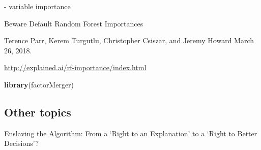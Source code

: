 \documentclass[12pt,]{krantz}
\newenvironment{Shaded}{\begin{snugshade}}{\end{snugshade}}
\newcommand{\KeywordTok}[1]{\textcolor[rgb]{0.13,0.29,0.53}{\textbf{#1}}}
\newcommand{\NormalTok}[1]{#1}
\begin{document}
\citep{demsar2018}

\citep{RJ2017016}
\citep{MAGIX}

\citep{R-factorMerger}

\citep{Strobl2007}
\citep{Strobl2008}
- variable importance

\citep{2018arXiv180101489F}

Beware Default Random Forest Importances

Terence Parr, Kerem Turgutlu, Christopher Csiszar, and Jeremy Howard
March 26, 2018.

\url{http://explained.ai/rf-importance/index.html}

\begin{Shaded}
\begin{Highlighting}[]
\KeywordTok{library}\NormalTok{(factorMerger)}
\end{Highlighting}
\end{Shaded}

\hypertarget{other-topics}{%
\subsection{Other topics}\label{other-topics}}

Enslaving the Algorithm: From a `Right to an Explanation' to a `Right to Better Decisions'?
\citep{Edwards_Veale_2018}

\citep{R-randomForestExplainer}
\citep{R-ICEbox}
\citep{R-ALEPlot}

\citep{R-modelDown}


\end{document}

